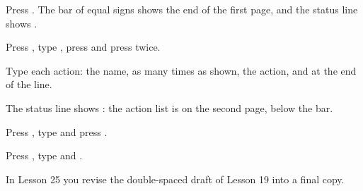 \begin{WPSteps}
\item Press .  The bar of equal signs shows the end of
the first page, and the status line shows .
\item Press , type , press
 and press  twice.
\item Type each action: the name,  as many times as shown, the action,
and  at the end of the line.
\end{WPSteps}
\par\addvspace{4pt}
\begingroup\setlength\parskip{1pt}
\endgroup
\par\addvspace{4pt}
The status line shows : the action list is on the second page,
below the bar.

\begin{WPSteps}
\item Press , type  and press
.
\item Press , type  and .
\end{WPSteps}
\EndReplay
In Lesson 25 you revise the double-spaced draft of Lesson 19 into a final
copy.
